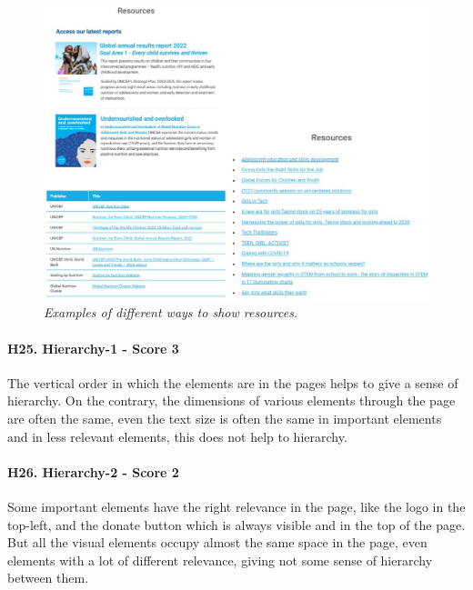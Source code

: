 \begin{figure}[!h]
	\begin{center}
		\includegraphics[width=\textwidth]{FinalScores29.jpg}
		\captionsetup{font=small}
		\caption{\textit{Examples of different ways to show resources.}}
	\end{center}
\end{figure}
\newline
\newline \paragraph{H25. Hierarchy-1 - Score 3}  \label{subsec:H25}	The vertical order in which the elements are in the pages helps to give a sense of hierarchy. On the contrary, the dimensions of various elements through the page are often the same, even the text size is often the same in important elements and in less relevant elements, this does not help to hierarchy.
\newline
\newline \paragraph{H26. Hierarchy-2 - Score 2}	\label{subsec:H26} Some important elements have the right relevance in the page, like the logo in the top-left, and the donate button which is always visible and in the top of the page.
\newline But all the visual elements occupy almost the same space in the page, even elements with a lot of different relevance, giving not some sense of hierarchy between them.
